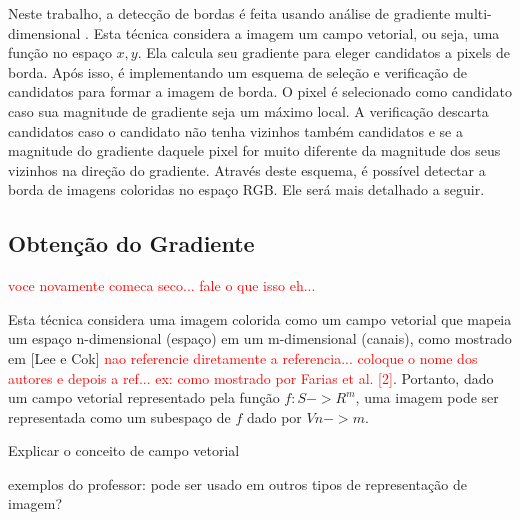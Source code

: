 Neste trabalho, a detecção de bordas é feita usando análise de gradiente multi-dimensional \cite{borda00}. Esta técnica considera a imagem um campo vetorial, ou seja, uma função no espaço $x,y$. Ela calcula seu gradiente para eleger candidatos a pixels de borda. Após isso, é implementando um esquema de seleção e verificação de candidatos para formar a imagem de borda. O pixel é selecionado como candidato caso sua magnitude de gradiente seja um máximo local. A verificação descarta candidatos caso o candidato não tenha vizinhos também candidatos e se a magnitude do gradiente daquele pixel for muito diferente da magnitude dos seus vizinhos na direção do gradiente.
Através deste esquema, é possível detectar a borda de imagens coloridas no espaço RGB. Ele será mais detalhado a seguir.




\subsection{Obtenção do Gradiente}

\textcolor{red}{voce novamente comeca seco... fale o que isso eh...}


Esta técnica considera uma imagem colorida como um campo vetorial que mapeia um espaço n-dimensional (espaço) em um m-dimensional (canais), como mostrado em [Lee e Cok] \textcolor{red}{nao referencie diretamente a referencia... coloque o nome dos autores e depois a ref... ex: como mostrado por Farias et al. [2]}. Portanto, dado um campo vetorial representado pela função $ f: S->R^m $, uma imagem pode ser representada como um subespaço de $f$ dado por $ Vn->m $.

Explicar o conceito de campo vetorial

exemplos do professor: pode ser usado em outros tipos de representação de imagem?



